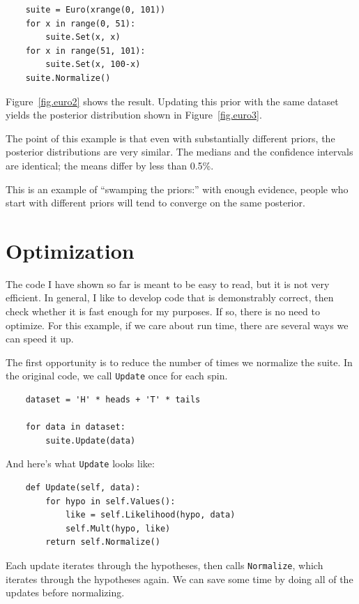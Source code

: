 \documentclass[12pt]{book}
\begin{document}
\begin{verbatim}
    suite = Euro(xrange(0, 101))
    for x in range(0, 51):
        suite.Set(x, x)
    for x in range(51, 101):
        suite.Set(x, 100-x) 
    suite.Normalize()
\end{verbatim}

Figure~\ref{fig.euro2} shows the result.  Updating this prior
with the same dataset yields the posterior distribution shown
in Figure~\ref{fig.euro3}.

The point of this example is that even with substantially different
priors, the posterior distributions are very similar.  The medians
and the confidence intervals are identical; the means differ by
less than 0.5\%.

This is an example of ``swamping the priors:'' with enough
evidence, people who start with different priors will tend to
converge on the same posterior.


\section{Optimization}

The code I have shown so far is meant to be easy to read, but it
is not very efficient.  In general, I like to develop code that
is demonstrably correct, then check whether it is fast enough for
my purposes.  If so, there is no need to optimize.
For this example, if we care about run time,
there are several ways we can speed it up.

The first opportunity is to reduce the number of times we
normalize the suite.
In the original code, we call \verb"Update" once for each spin.

\begin{verbatim}
    dataset = 'H' * heads + 'T' * tails

    for data in dataset:
        suite.Update(data)
\end{verbatim}

And here's what \verb"Update" looks like:

\begin{verbatim}
    def Update(self, data):
        for hypo in self.Values():
            like = self.Likelihood(hypo, data)
            self.Mult(hypo, like)
        return self.Normalize()
\end{verbatim}

Each update iterates through the hypotheses, then calls \verb"Normalize",
which iterates through the hypotheses again.  We can save some
time by doing all of the updates before normalizing.
\end{document}
